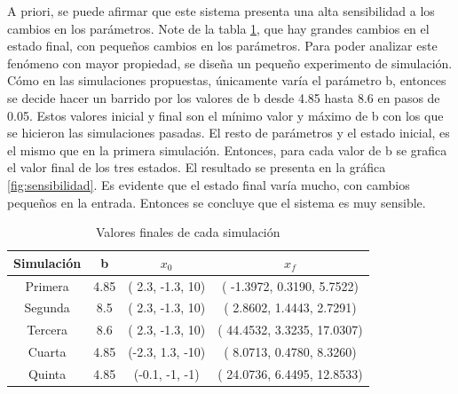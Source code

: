 \documentclass[12pt,letterpaper]{article}
\begin{document}
A priori, se puede afirmar que este sistema presenta una alta sensibilidad a los cambios en los parámetros. Note de la tabla \ref{table:finales_ejercicio_1}, que hay grandes cambios en el estado final, con pequeños cambios en los parámetros. Para poder analizar este fenómeno con mayor propiedad, se diseña un pequeño experimento de simulación. Cómo en las simulaciones propuestas, únicamente varía el parámetro b, entonces se decide hacer un barrido por los valores de b desde 4.85 hasta 8.6 en pasos de 0.05. Estos valores inicial y final son el mínimo valor y máximo de b con los que se hicieron las simulaciones pasadas. El resto de parámetros y el estado inicial, es el mismo que en la primera simulación. Entonces, para cada valor de b se grafica el valor final de los tres estados. El resultado se presenta en la gráfica \ref{fig:sensibilidad}. Es evidente que el estado final varía mucho, con cambios pequeños en la entrada. Entonces se concluye que el sistema es muy sensible.

 




\begin{table}
\caption{Valores finales de cada simulación}
\label{table:finales_ejercicio_1}
\centering
\begin{tabular}{| c | c  c  c|}
  \hline
 Simulación & b   & $x_0$   & $x_f$   \\
 \hline
 Primera    & 4.85&( 2.3, -1.3,  10) &( -1.3972, 0.3190, 5.7522) \\
 Segunda    & 8.5& ( 2.3, -1.3,  10) &( 2.8602,  1.4443, 2.7291) \\
 Tercera    & 8.6& ( 2.3, -1.3,  10) &( 44.4532, 3.3235, 17.0307)\\
 Cuarta     & 4.85&(-2.3,  1.3, -10) &( 8.0713,  0.4780, 8.3260)\\
 Quinta     & 4.85&(-0.1, -1,    -1) &( 24.0736, 6.4495, 12.8533)\\
 \hline

\end{tabular}
\end{table}
\end{document}
